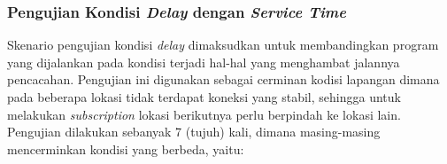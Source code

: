 %
%
%
%
%
%


\subsubsection{Pengujian Kondisi \textit{Delay} dengan \textit{Service Time}}
\label{sssec:test-delay-service-time}
Skenario pengujian kondisi \textit{delay} dimaksudkan untuk membandingkan program yang dijalankan pada kondisi terjadi hal-hal yang menghambat jalannya pencacahan. Pengujian ini digunakan sebagai cerminan kodisi lapangan dimana pada beberapa lokasi tidak terdapat koneksi yang stabil, sehingga untuk melakukan \textit{subscription} lokasi berikutnya perlu berpindah ke lokasi lain. Pengujian dilakukan sebanyak 7 (tujuh) kali, dimana masing-masing mencerminkan kondisi yang berbeda, yaitu:

